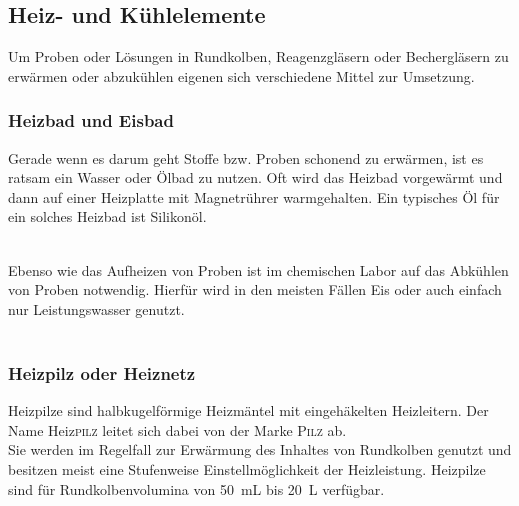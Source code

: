 \subsection{Heiz- und Kühlelemente}
Um Proben oder Lösungen in Rundkolben, Reagenzgläsern oder Bechergläsern zu erwärmen oder abzukühlen eigenen sich verschiedene Mittel zur Umsetzung.



\subsubsection*{Heizbad und Eisbad}
Gerade wenn es darum geht Stoffe bzw. Proben schonend zu erwärmen, ist es ratsam ein Wasser oder Ölbad zu nutzen. Oft wird das Heizbad vorgewärmt und dann auf einer Heizplatte mit Magnetrührer warmgehalten. Ein typisches Öl für ein solches Heizbad ist Silikonöl.\\

\\

\vspace*{7mm}

Ebenso wie das Aufheizen von Proben ist im chemischen Labor auf das Abkühlen von Proben notwendig. Hierfür wird in den meisten Fällen Eis oder auch einfach nur Leistungswasser genutzt.\\

\\

\newpage

\subsubsection*{Heizpilz oder Heiznetz}
Heizpilze sind halbkugelförmige Heizmäntel mit eingehäkelten Heizleitern. Der Name Heiz\textsc{pilz} leitet sich dabei von der Marke \textsc{Pilz} ab.\\
Sie werden im Regelfall zur Erwärmung des Inhaltes von Rundkolben genutzt und besitzen meist eine Stufenweise Einstellmöglichkeit der Heizleistung. Heizpilze sind für Rundkolbenvolumina von \SI{50}{\milli \liter} bis \SI{20}{\liter} verfügbar.\\

